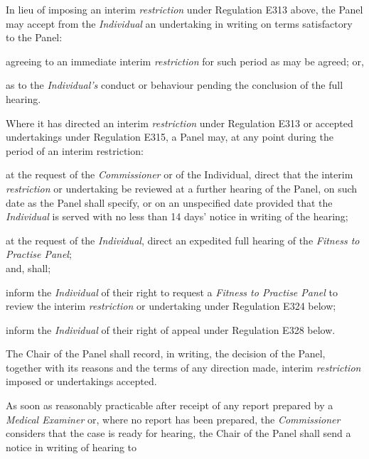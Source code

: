 \par
In lieu of imposing an interim \emph{restriction} under Regulation E313
above, the Panel may accept from the \emph{Individual} an undertaking in
writing on terms satisfactory to the Panel:\\\nl \item  agreeing to an immediate interim \emph{restriction} for such period
as may be agreed; or,\item as to the \emph{Individual's} conduct or behaviour pending the
conclusion of the full hearing.\ln
{}\par
Where it has directed an interim \emph{restriction} under Regulation
E313 or accepted undertakings under Regulation E315, a Panel may, at any
point during the period of an interim restriction:\\\nl \item at the request of the \emph{Commissioner} or of the Individual,
direct that the interim \emph{restriction} or undertaking be reviewed at
a further hearing of the Panel, on such date as the Panel shall specify,
or on an unspecified date provided that the \emph{Individual} is served
with no less than 14 days' notice in writing of the hearing;\item at the request of the \emph{Individual}, direct an expedited full
hearing of the \emph{Fitness to Practise Panel};\\
and, shall;\al
\item inform the \emph{Individual} of their right to request
a \emph{Fitness to Practise Panel }to review the
interim \emph{restriction} or undertaking under Regulation E324 below;\\
\item inform the \emph{Individual} of their right of appeal under
Regulation E328 below.\la\ln
{}\par
The Chair of the Panel shall record, in writing, the decision of the
Panel, together with its reasons and the terms of any direction made,
interim \emph{restriction} imposed or undertakings accepted.
\par
{}
As soon as reasonably practicable after receipt of any report prepared
by a \emph{Medical Examiner} or, where no report has been prepared,
the \emph{Commissioner} considers that the case is ready for hearing,
the Chair of the Panel shall send a notice in writing of hearing to
